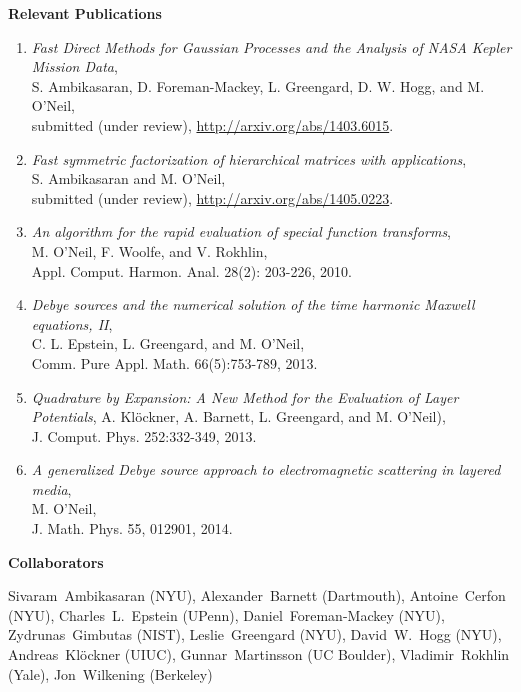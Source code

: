 \documentclass[letterpaper,12pt]{article}
\begin{document}
\noindent
{\bf Relevant Publications}
\begin{enumerate}
    \item {\em Fast Direct Methods for Gaussian Processes and the
        Analysis of NASA Kepler Mission Data},\\
            S. Ambikasaran, D. Foreman-Mackey,
                L. Greengard, D. W. Hogg, and M. O'Neil,\\
                submitted (under review),
            \url{http://arxiv.org/abs/1403.6015}.
    \item {\em Fast symmetric factorization of hierarchical matrices
            with applications},\\
            S. Ambikasaran and M. O'Neil,\\
            submitted (under review), \url{http://arxiv.org/abs/1405.0223}. 
    \item {\em An algorithm for the rapid evaluation of special 
            function transforms},\\
            M. O'Neil, F. Woolfe, and V. Rokhlin, \\
            Appl. Comput. Harmon. Anal. 28(2): 203-226, 2010.
    \item {\em Debye sources and the numerical solution of the time 
        harmonic Maxwell equations, II},\\
        C. L. Epstein,  L. Greengard, and M. O'Neil,\\ 
        Comm. Pure Appl. Math. 66(5):753-789, 2013.
    \item {\em Quadrature by Expansion: A New Method for the Evaluation 
        of Layer Potentials},
        A. Kl\"ockner, A. Barnett, L. Greengard, and M. O'Neil),\\
        J. Comput. Phys. 252:332-349, 2013.
    \item {\em A generalized Debye source approach to electromagnetic
        scattering in layered media},\\
        M. O'Neil,\\
        J. Math. Phys. 55, 012901, 2014.\\
\end{enumerate}




   
\noindent
{\bf Collaborators} \par \noindent
Sivaram~Ambikasaran (NYU),
Alexander~Barnett (Dartmouth),
Antoine~Cerfon (NYU),
Charles~L.~Epstein (UPenn),
Daniel~Foreman-Mackey (NYU),
Zydrunas~Gimbutas (NIST),
Leslie~Greengard (NYU),
David~W.~Hogg (NYU),
Andreas~Kl\"ockner (UIUC),
Gunnar~Martinsson (UC Boulder),
Vladimir~Rokhlin (Yale),
Jon~Wilkening (Berkeley)\\
\end{document}
